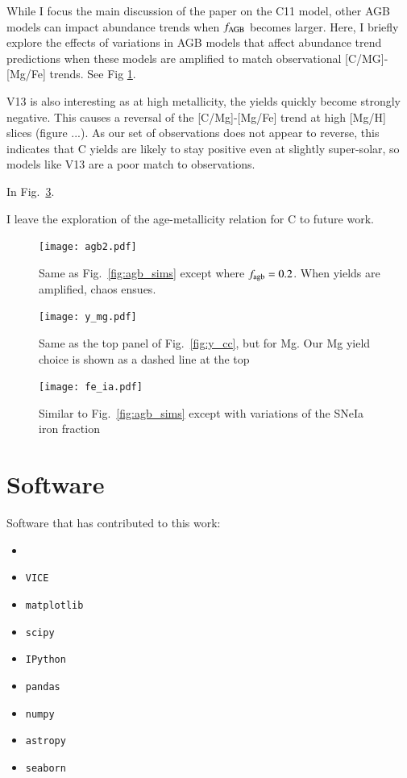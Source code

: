 \documentclass[12pt,oneside]{report}
\newcommand{\VICE}{\texttt{VICE}}
\begin{document}
While I focus the main discussion of the paper on the C11 model, other AGB models can impact abundance trends when $f_{\rm AGB}$ becomes larger.
Here, I briefly explore the effects of variations in AGB models that affect abundance trend predictions when these models are amplified to match observational [C/MG]-[Mg/Fe] trends. 
See Fig \ref{fig:fagb2}.

V13 is also interesting as at high metallicity, the yields quickly become strongly negative. This causes a reversal of the [C/Mg]-[Mg/Fe] trend at high [Mg/H] slices (figure ...). As our set of observations does not appear to reverse, this indicates that C yields are likely to stay positive even at slightly super-solar, so models like V13 are a poor match to observations. 

In Fig.~\ref{fig:fe_ia}.

I leave the exploration of the age-metallicity relation for C to future work.


\begin{figure}[htp]
    \centering
    \texttt{[image: agb2.pdf]}

    \caption[Alternate AGB models]{Same as Fig.~\ref{fig:agb_sims} except where $f_{\rm agb}=0.2$. When yields are amplified, chaos ensues.}
    \label{fig:fagb2}
\end{figure}


\begin{figure}
    \centering
    \texttt{[image: y\_mg.pdf]}
    \caption[Magnesium CCSNe yields]{Same as the top panel of Fig.~\ref{fig:y_cc}, but for Mg. Our Mg yield choice is shown as a dashed line at the top
    }
    \label{fig:y_mg}
\end{figure}

\begin{figure}
    \centering
    \texttt{[image: fe\_ia.pdf]}
    \caption[Adjusting type Ia iron]{Similar to Fig.~\ref{fig:agb_sims} except with variations of the SNeIa iron fraction}
    \label{fig:fe_ia}
\end{figure}




\newpage

\section{Software}

Software that has contributed to this work:

\begin{itemize}
    \item \citet{OhioSupercomputerCenter1987}
    \item \VICE~\citep{JW20, james+21}
    \item \texttt{matplotlib} \citep{matplotlib}
    \item \texttt{scipy} \citep{scipy}
    \item \texttt{IPython} \citep{ipy}
    \item \texttt{pandas} \citep{pandas}
    \item \texttt{numpy} \citep{numpy}
    \item \texttt{astropy} \citep{astropy:2013, astropy:2018, astropy:2022}
    \item \texttt{seaborn}
\end{itemize}
\end{document}

